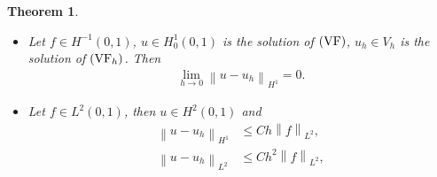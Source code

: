 \documentclass[11pt,a4paper,center,notitlepage]{article}
\numberwithin{equation}{section}
\newtheorem{theorem}{Theorem}[section]
\begin{document}
\begin{theorem}\label{theorem1.6}
\begin{itemize}
\item[a)] Let $f\in H^{-1}\left(0,1\right)$, $u\in H_0^1\left(0,1\right)$ is the solution of $\left( {\rm VF}\right)$, $u_h\in V_h$ is the solution of $\left( {\rm VF}_h \right)$. Then
\begin{align}
\mathop {\lim }\limits_{h \to 0} {\left\| {u - {u_h}} \right\|_{{H^1}}} = 0.
\end{align}
\item[b)] Let $f\in L^2\left(0,1\right)$, then $u\in H^2\left(0,1\right)$ and
\begin{align}
{\left\| {u - {u_h}} \right\|_{{H^1}}} &\le Ch{\left\| f \right\|_{{L^2}}}, \\
{\left\| {u - {u_h}} \right\|_{{L^2}}} &\le C{h^2}{\left\| f \right\|_{{L^2}}},
\end{align}
\end{itemize}
\end{theorem}
\end{document}
